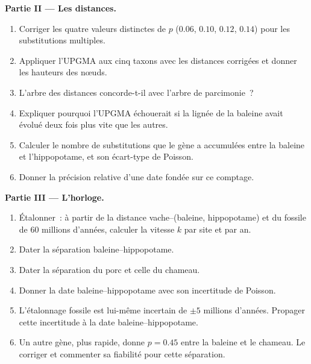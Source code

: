 \begin{problem}
\medskip
\noindent\textbf{Partie II --- Les distances.}
\begin{enumerate}[resume]
  \item Corriger les quatre valeurs distinctes de $p$ ($0.06$, $0.10$, $0.12$,
        $0.14$) pour les substitutions multiples.
  \item Appliquer l'UPGMA aux cinq taxons avec les distances corrigées et
        donner les hauteurs des nœuds.
  \item L'arbre des distances concorde-t-il avec l'arbre de parcimonie~?
  \item Expliquer pourquoi l'UPGMA échouerait si la lignée de la baleine
        avait évolué deux fois plus vite que les autres.
  \item Calculer le nombre de substitutions que le gène a accumulées entre
        la baleine et l'hippopotame, et son écart-type de
        Poisson.
  \item Donner la précision relative d'une date fondée sur ce comptage.
\end{enumerate}

\medskip
\noindent\textbf{Partie III --- L'horloge.}
\begin{enumerate}[resume]
  \item Étalonner~: à partir de la distance vache--(baleine, hippopotame)
        et du fossile de 60 millions d'années, calculer la vitesse $k$ par
        site et par an.
  \item Dater la séparation baleine--hippopotame.
  \item Dater la séparation du porc et celle du chameau.
  \item Donner la date baleine--hippopotame avec son incertitude de Poisson.
  \item L'étalonnage fossile est lui-même incertain de $\pm 5$
        millions d'années. Propager cette incertitude à la date
        baleine--hippopotame.
  \item Un autre gène, plus rapide, donne $p = 0.45$ entre la baleine et
        le chameau. Le corriger et commenter sa fiabilité pour cette
        séparation.
\end{enumerate}


\end{problem}
